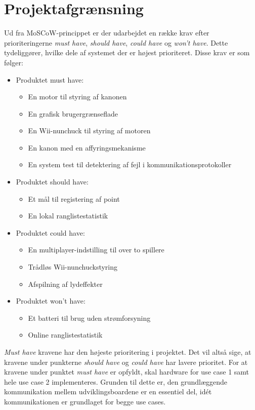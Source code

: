 \chapter{Projektafgrænsning}
\label{afsnit:Projektafgraensning}
Ud fra MoSCoW-princippet \cite{moscow} er der udarbejdet en række krav efter prioriteringerne \textit{must have}, \textit{should have}, \textit{could have} og \textit{won’t have}. Dette tydeliggører, hvilke dele af systemet der er højest prioriteret. Disse krav er som følger:

\begin{itemize}
	\item Produktet must have:
	\begin{itemize}
		\item En motor til styring af kanonen
		\item En grafisk brugergrænseflade
		\item En Wii-nunchuck til styring af motoren
		\item En kanon med en affyringsmekanisme
		\item En system test til detektering af fejl i kommunikationsprotokoller
	\end{itemize}
	\item Produktet should have:
	\begin{itemize}
		\item Et mål til registering af point
		\item En lokal ranglistestatistik
	\end{itemize}
	\item Produktet could have:
	\begin{itemize}
		\item En multiplayer-indstilling til over to spillere
		\item Trådløs Wii-nunchuckstyring
		\item Afspilning af lydeffekter
	\end{itemize}
	\item Produktet won’t have:
	\begin{itemize}
		\item Et batteri til brug uden strømforsyning
		\item Online ranglistestatistik
	\end{itemize}
\end{itemize}

\noindent \textit{Must have} kravene har den højeste prioritering i projektet. Det vil altså sige, at kravene under punkterne \textit{should have} og \textit{could have} har lavere prioritet. For at kravene under punktet \textit{must have} er opfyldt, skal hardware for use case 1 samt hele use case 2 implementeres. Grunden til dette er, den grundlæggende kommunikation mellem udviklingsboardene er en essentiel del, idét kommunikationen er grundlaget for begge use cases.
